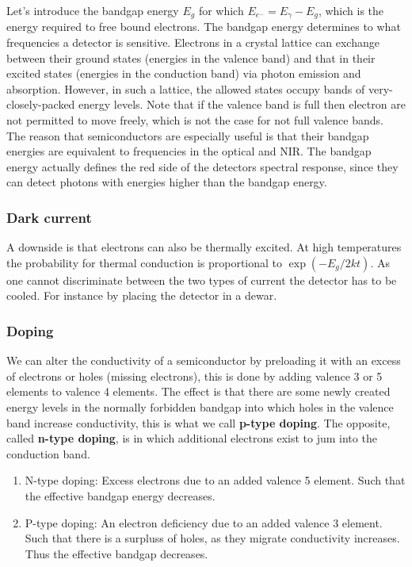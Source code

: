 \documentclass[a4paper]{article}
\begin{document}
\bigskip

Let's introduce the bandgap energy $E_g$ for which $E_{e^{-}}=E_\gamma-E_g$, which is the energy required to free bound electrons. The bandgap energy determines to what frequencies a detector is sensitive. Electrons in a crystal lattice can exchange between their ground states (energies in the valence band) and that in their excited states (energies in the conduction band) via photon emission and absorption. However, in such a lattice, the allowed states occupy bands of very-closely-packed energy levels. Note that if the valence band is full then electron are not permitted to move freely, which is not the case for not full valence bands. The reason that semiconductors are especially useful is that their bandgap energies are equivalent to frequencies in the optical and NIR. The bandgap energy actually defines the red side of the detectors spectral response, since they can detect photons with energies higher than the bandgap energy.

\subsubsection*{Dark current}

A downside is that electrons can also be thermally excited. At high temperatures the probability for thermal conduction is proportional to $\exp(-E_g/2kt)$. As one cannot discriminate between the two types of current the detector has to be cooled. For instance by placing the detector in a dewar.

\subsubsection*{Doping}

We can alter the conductivity of a semiconductor by preloading it with an excess of electrons or holes (missing electrons), this is done by adding valence 3 or 5 elements to valence 4 elements. The effect is that there are some newly created energy levels in the normally forbidden bandgap into which holes in the valence band increase conductivity, this is what we call \textbf{p-type doping}. The opposite, called \textbf{n-type doping}, is in which additional electrons exist to jum into the conduction band.

\begin{enumerate}
    \item N-type doping: Excess electrons due to an added valence 5 element. Such that the effective bandgap energy decreases.
    \item P-type doping: An electron deficiency due to an added valence 3 element. Such that there is a surpluss of holes, as they migrate conductivity increases. Thus the effective bandgap decreases.
\end{enumerate}
\end{document}
